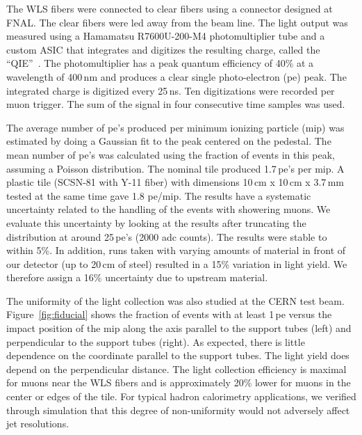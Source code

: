\documentclass[review]{elsarticle}
\begin{document}
The WLS fibers were connected to clear fibers using a
connector designed at FNAL. The clear fibers were led away from the
beam line. The light output was measured using a Hamamatsu
R7600U-200-M4 photomultiplier tube and a custom ASIC that integrates
and digitizes the resulting charge, called the ``QIE''~\cite{qie}.
The photomultiplier has a peak quantum efficiency of 40\% at a
wavelength of 400\,nm and produces a clear single photo-electron (pe)
peak. The integrated charge is digitized every 25\,ns. Ten
digitizations were recorded per muon trigger. The sum of the signal
in four consecutive time samples was used.

The average number of pe's produced per minimum ionizing particle
(mip) was estimated by doing a Gaussian fit to the peak centered on
the pedestal. The mean number of pe's was calculated using the
fraction of events in this peak, assuming a Poisson distribution. The
nominal tile produced 1.7\,pe's per mip.
A plastic tile (SCSN-81 with Y-11 fiber) with dimensions 10\,cm x 10\,cm x 3.7\,mm tested
at the same time gave 1.8 pe/mip.
The results
have a systematic uncertainty related to the handling of the events
with showering muons. We evaluate this uncertainty by looking at the
results after truncating the distribution at around 25\,pe's (2000 adc
counts). The results were stable to within 5\%. In addition, runs
taken with varying amounts of material in front of our detector
(up to 20\,cm of steel)
resulted in a 15\% variation in light yield.
We therefore assign a 16\% uncertainty due to upstream material.

The uniformity of the light collection was also studied at the CERN
test beam. Figure~\ref{fig:fiducial} shows the fraction of events with at
least 1\,pe versus the impact position of the mip along the axis
parallel to the support tubes (left) and perpendicular to the support
tubes (right). As expected, there is little dependence on the
coordinate parallel to the support tubes. The light yield does depend
on the perpendicular distance. The light collection efficiency is
maximal for muons near the WLS fibers and is approximately 20\%
lower for muons in the center or edges of the tile. For typical hadron
calorimetry applications, we verified through simulation that this
degree of non-uniformity would not adversely affect jet resolutions.
\end{document}
